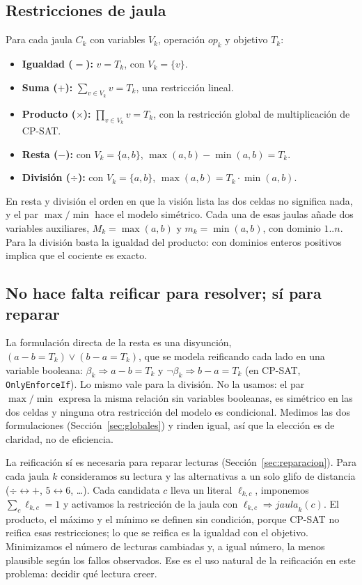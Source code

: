 \documentclass[conference]{IEEEtran}
\begin{document}
\subsection{Restricciones de jaula}
Para cada jaula $C_k$ con variables $V_k$, operación $op_k$ y objetivo $T_k$:
\begin{itemize}
    \item \textbf{Igualdad ($=$):} $v = T_k$, con $V_k = \{v\}$.
    \item \textbf{Suma ($+$):} $\sum_{v \in V_k} v = T_k$, una restricción lineal.
    \item \textbf{Producto ($\times$):} $\prod_{v \in V_k} v = T_k$, con la restricción global de multiplicación de CP-SAT.
    \item \textbf{Resta ($-$):} con $V_k = \{a, b\}$, $\max(a,b) - \min(a,b) = T_k$.
    \item \textbf{División ($\div$):} con $V_k = \{a, b\}$, $\max(a,b) = T_k \cdot \min(a,b)$.
\end{itemize}
En resta y división el orden en que la visión lista las dos celdas no significa nada, y el par $\max/\min$ hace el modelo simétrico. Cada una de esas jaulas añade dos variables auxiliares, $M_k = \max(a,b)$ y $m_k = \min(a,b)$, con dominio $1..n$. Para la división basta la igualdad del producto: con dominios enteros positivos implica que el cociente es exacto.

\subsection{No hace falta reificar para resolver; sí para reparar}
La formulación directa de la resta es una disyunción, $(a - b = T_k) \lor (b - a = T_k)$, que se modela reificando cada lado en una variable booleana: $\beta_k \Rightarrow a - b = T_k$ y $\lnot \beta_k \Rightarrow b - a = T_k$ (en CP-SAT, \texttt{OnlyEnforceIf}). Lo mismo vale para la división. No la usamos: el par $\max/\min$ expresa la misma relación sin variables booleanas, es simétrico en las dos celdas y ninguna otra restricción del modelo es condicional. Medimos las dos formulaciones (Sección~\ref{sec:globales}) y rinden igual, así que la elección es de claridad, no de eficiencia.

La reificación sí es necesaria para reparar lecturas (Sección~\ref{sec:reparacion}). Para cada jaula $k$ consideramos su lectura y las alternativas a un solo glifo de distancia ($\div \leftrightarrow +$, $5 \leftrightarrow 6$, \dots). Cada candidata $c$ lleva un literal $\ell_{k,c}$, imponemos $\sum_c \ell_{k,c} = 1$ y activamos la restricción de la jaula con $\ell_{k,c} \Rightarrow \textit{jaula}_k(c)$. El producto, el máximo y el mínimo se definen sin condición, porque CP-SAT no reifica esas restricciones; lo que se reifica es la igualdad con el objetivo. Minimizamos el número de lecturas cambiadas y, a igual número, la menos plausible según los fallos observados. Ese es el uso natural de la reificación en este problema: decidir qué lectura creer.
\end{document}
